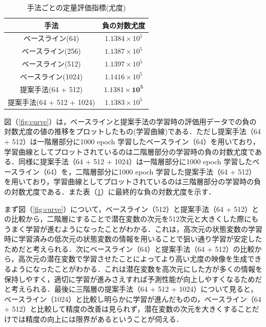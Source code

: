 \begin{table}[tbp]
    \begin{center}
    \caption{手法ごとの定量評価指標(尤度)}
    \begin{tabular}{|c||c|} \hline
      手法 & 負の対数尤度 \\ \hline \hline
      ベースライン(64) & $1.1384 \times 10^5 $ \\ \hline
      ベースライン(256) & $1.1387 \times 10^5 $ \\ \hline
      ベースライン(512) & $1.1397 \times 10^5 $ \\ \hline
      ベースライン(1024) & $1.1416 \times 10^5 $ \\ \hline
      提案手法(64 + 512) & $\bm{1.1381 \times 10^5 }$ \\ \hline
      提案手法(64 + 512 + 1024) & $1.1383 \times 10^5$ \\ \hline
    \end{tabular}
    \label{table:evaluation}
    \end{center}
  \end{table}
  

図（\ref{fig:curve}）は，ベースラインと提案手法の学習時の評価用データでの負の対数尤度の値の推移をプロットしたもの(学習曲線)である．ただし提案手法（64 + 512）は一階層部分に1000 epoch 学習したベースライン（64）を用いており，学習曲線としてプロットされているのは二階層部分の学習時の負の対数尤度である．同様に提案手法（64 + 512 + 1024）は一階層部分に1000 epoch 学習したベースライン（64）を，二階層部分に1000 epoch 学習した提案手法（64 + 512）を用いており，学習曲線としてプロットされているのは三階層部分の学習時の負の対数尤度である．また表（\ref{table:evaluation}）に最終的な負の対数尤度を示す．

まず図（\ref{fig:curve}）について，ベースライン（512）と提案手法（64 + 512）との比較から，二階層にすることで潜在変数の次元を512次元と大きくした際にもうまく学習が進むようになったことがわかる．これは，高次元の状態変数の学習時に学習済みの低次元の状態変数の情報を用いることで狙い通り学習が安定したためだと考えられる．次にベースライン（64）と提案手法（64 + 512）の比較から，高次元の潜在変数で学習させたことによってより高い尤度の映像を生成できるようになったことがわかる．これは潜在変数を高次元にした方が多くの情報を保持しやすく，適切に学習が進みさえすれば予測性能が向上しやすくなるためだと考えられる．最後に三階層の提案手法（64 + 512 + 1024）について見ると，ベースライン（1024）と比較し明らかに学習が進んだものの，ベースライン（64 + 512）と比較して精度の改善は見られず，潜在変数の次元を大きくすることだけでは精度の向上には限界があるということが伺える．

